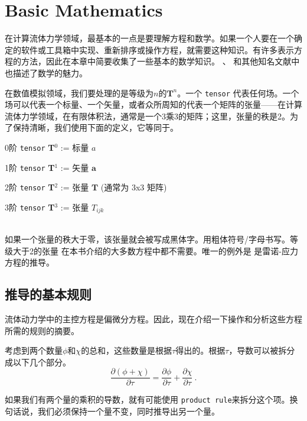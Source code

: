 \documentclass[LBMDerivation.tex]{subfiles}
\begin{document}


\chapter{Basic Mathematics}
\label{CHAPTER::Mathematics}
%
%
%

	在计算流体力学领域，最基本的一点是要理解方程和数学。如果一个人要在一个确定的软件或工具箱中实现、重新排序或操作方程，就需要这种知识。有许多表示方程的方法，因此在本章中简要收集了一些基本的数学知识。 \cite{JasakPhD, Rappaz, ProgrammersGuide}、 \cite{Moukalled15}和其他知名文献中也描述了数学的魅力。


在数值模拟领域，我们要处理的是等级为$n$的$\textbf{T}^n$。一个  \texttt{tensor} 代表任何场。一个场可以代表一个标量、一个矢量，或者众所周知的代表一个矩阵的张量------在计算流体力学领域，在有限体积法，通常是一个3乘3的矩阵；这里，张量的秩是2。为了保持清晰，我们使用下面的定义，它等同于\cite{ProgrammersGuide}。


%
%
	\vspace{0.5cm}

	0阶 \texttt{tensor} \textbf{T}$^0$ := 标量 $a$

	1阶 \texttt{tensor} \textbf{T}$^1$ := 矢量 $\textbf{a}$

	2阶 \texttt{tensor} \textbf{T}$^2$ := 张量 $\textbf{T}$ (通常为 3x3 矩阵)

	3阶 \texttt{tensor} \textbf{T}$^3$ := 张量 $T_{ijk}$

	~\\
%
%
	如果一个张量的秩大于零，该张量就会被写成黑体字。用粗体符号/字母书写。等级大于2的张量 在本书介绍的大多数方程中都不需要。唯一的例外是 是雷诺-应力方程的推导。
%
%
\section{推导的基本规则}
%
%
	流体动力学中的主控方程是偏微分方程。因此，现在介绍一下操作和分析这些方程所需的规则的摘要。


  	考虑到两个数量$\phi$和$\chi$的总和，这些数量是根据$\tau$得出的。根据$\tau$，导数可以被拆分成以下几个部分。
%
%
\begin{equation}
 \frac{\partial (\phi + \chi)}{\partial \tau}
 =
 \frac{\partial \phi }{\partial \tau} + \frac{\partial \chi}{\partial \tau} ~.
\end{equation}
%
%

如果我们有两个量的乘积的导数，就有可能使用 \texttt{product rule}来拆分这个项。换句话说，我们必须保持一个量不变，同时推导出另一个量。
\end{document}

